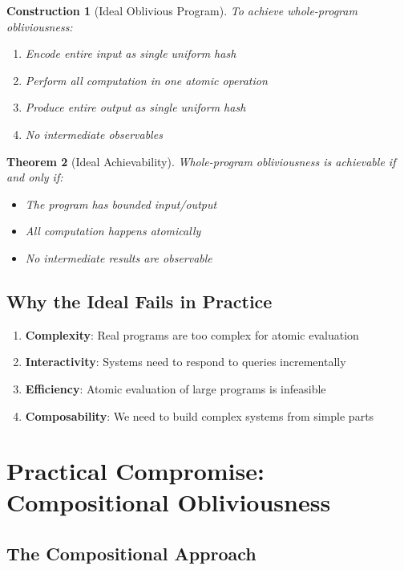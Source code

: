 \documentclass[11pt,final]{article}
\newtheorem{theorem}{Theorem}[section]
\newtheorem{construction}[theorem]{Construction}
\begin{document}
\begin{construction}[Ideal Oblivious Program]
To achieve whole-program obliviousness:
\begin{enumerate}
    \item Encode entire input as single uniform hash
    \item Perform all computation in one atomic operation
    \item Produce entire output as single uniform hash
    \item No intermediate observables
\end{enumerate}
\end{construction}

\begin{theorem}[Ideal Achievability]
Whole-program obliviousness is achievable if and only if:
\begin{itemize}
    \item The program has bounded input/output
    \item All computation happens atomically
    \item No intermediate results are observable
\end{itemize}
\end{theorem}

\subsection{Why the Ideal Fails in Practice}

\begin{enumerate}
    \item \textbf{Complexity}: Real programs are too complex for atomic evaluation
    \item \textbf{Interactivity}: Systems need to respond to queries incrementally
    \item \textbf{Efficiency}: Atomic evaluation of large programs is infeasible
    \item \textbf{Composability}: We need to build complex systems from simple parts
\end{enumerate}

\section{Practical Compromise: Compositional Obliviousness}

\subsection{The Compositional Approach}
\end{document}
